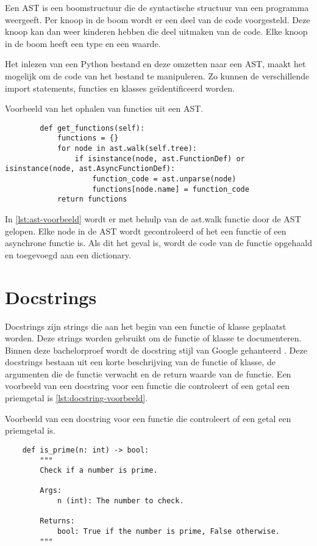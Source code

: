 Een AST is een boomstructuur die de syntactische structuur van een programma weergeeft.
Per knoop in de boom wordt er een deel van de code voorgesteld. 
Deze knoop kan dan weer kinderen hebben die deel uitmaken van de code.
Elke knoop in de boom heeft een type en een waarde.

Het inlezen van een Python bestand en deze omzetten naar een AST, maakt het mogelijk om de code van het bestand te manipuleren.
Zo kunnen de verschillende import statements, functies en klasses geïdentificeerd worden.

\begin{listing}
    \caption{Voorbeeld van het ophalen van functies uit een AST.}
    \label{lst:ast-voorbeeld}
    \begin{verbatim}
        def get_functions(self):
            functions = {}
            for node in ast.walk(self.tree):
                if isinstance(node, ast.FunctionDef) or isinstance(node, ast.AsyncFunctionDef):
                    function_code = ast.unparse(node)
                    functions[node.name] = function_code
            return functions
    \end{verbatim}
\end{listing}

In \ref{lst:ast-voorbeeld} wordt er met behulp van de ast.walk functie door de AST gelopen.
Elke node in de AST wordt gecontroleerd of het een functie of een asynchrone functie is.
Als dit het geval is, wordt de code van de functie opgehaald en toegevoegd aan een dictionary.

\section{Docstrings}
\label{sec:bestanddocumentatie-docstrings}
Docstrings zijn strings die aan het begin van een functie of klasse geplaatst worden.
Deze strings worden gebruikt om de functie of klasse te documenteren.
Binnen deze bachelorproef wordt de docstring stijl van Google gehanteerd \autocite{GPT2024}.
Deze docstrings bestaan uit een korte beschrijving van de functie of klasse, de argumenten die de functie verwacht en de return waarde van de functie.
Een voorbeeld van een docstring voor een functie die controleert of een getal een priemgetal is \ref{lst:docstring-voorbeeld}.

\begin{listing}
    \caption{Voorbeeld van een docstring voor een functie die controleert of een getal een priemgetal is.}
    \label{lst:docstring-voorbeeld}
    \begin{verbatim}
    def is_prime(n: int) -> bool:
        """
        Check if a number is prime.

        Args:
            n (int): The number to check.

        Returns:
            bool: True if the number is prime, False otherwise.
        """
    \end{verbatim}
\end{listing}

